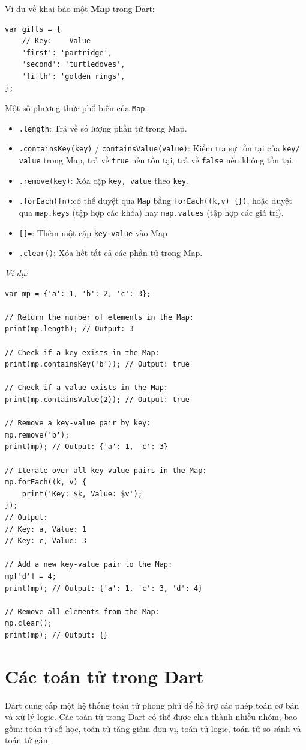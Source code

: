\documentclass[../DoAn.tex]{subfiles}
\numberwithin{figure}{chapter}
\begin{document}
Ví dụ về khai báo một \textbf{Map} trong Dart:
\begin{lstlisting}
var gifts = {
    // Key:    Value
    'first': 'partridge',
    'second': 'turtledoves',
    'fifth': 'golden rings',
};
\end{lstlisting}
Một số phương thức phổ biến của \texttt{Map}: 
\begin{itemize}
\item \texttt{.length}: Trả về số lượng phần tử trong Map.
\item \texttt{.containsKey(key)} / \texttt{containsValue(value)}: Kiểm tra sự tồn tại của \texttt{key/ value} trong Map, trả về \texttt{true} nếu tồn tại, trả về \texttt{false} nếu không tồn tại.
\item \texttt{.remove(key)}: Xóa cặp \texttt{key, value} theo \texttt{key}.
\item \texttt{.forEach(fn)}:có thể duyệt qua \texttt{Map} bằng \texttt{forEach((k,v) \{\})}, hoặc duyệt qua \texttt{map.keys} (tập hợp các khóa) hay \texttt{map.values} (tập hợp các giá trị).
\item \texttt{[]=}: Thêm một cặp \texttt{key-value} vào Map
\item \texttt{.clear()}: Xóa hết tất cả các phần tử trong Map.
\end{itemize}

\textit{Ví dụ:} 
\begin{lstlisting}
var mp = {'a': 1, 'b': 2, 'c': 3};

// Return the number of elements in the Map:
print(mp.length); // Output: 3

// Check if a key exists in the Map:
print(mp.containsKey('b')); // Output: true

// Check if a value exists in the Map:
print(mp.containsValue(2)); // Output: true

// Remove a key-value pair by key:
mp.remove('b');
print(mp); // Output: {'a': 1, 'c': 3}

// Iterate over all key-value pairs in the Map:
mp.forEach((k, v) {
    print('Key: $k, Value: $v');
});
// Output:
// Key: a, Value: 1
// Key: c, Value: 3

// Add a new key-value pair to the Map:
mp['d'] = 4;
print(mp); // Output: {'a': 1, 'c': 3, 'd': 4}

// Remove all elements from the Map:
mp.clear();
print(mp); // Output: {}
\end{lstlisting}

\section{Các toán tử trong Dart}
Dart cung cấp một hệ thống toán tử phong phú để hỗ trợ các phép toán cơ bản và xử lý logic. Các toán tử trong Dart có thể được chia thành nhiều nhóm, bao gồm: toán tử số học, toán tử tăng giảm đơn vị, toán tử logic, toán tử so sánh và toán tử gán. 
\end{document}
